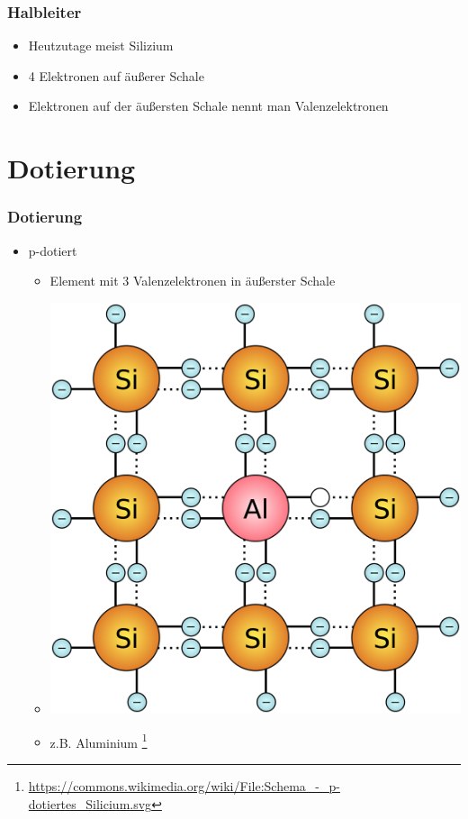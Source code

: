 \begin{frame}
    \frametitle{Halbleiter}
    \begin{center}
    \begin{itemize}
			\item Heutzutage meist Silizium
			\item 4 Elektronen auf äußerer Schale
			\item Elektronen auf der äußersten Schale nennt man Valenzelektronen
    \end{itemize}
	\end{center}
\end{frame}

\section*{Dotierung}

\begin{frame}
    \frametitle{Dotierung}
      	\begin{itemize}
			\item p-dotiert
      		\begin{itemize}
				\item Element mit 3 Valenzelektronen in äußerster Schale
				\item \includegraphics[height=.7\textheight]{e12/p-dot.png}
				\item z.B. Aluminium
        \footnote{\tiny \url{https://commons.wikimedia.org/wiki/File:Schema_-_p-dotiertes_Silicium.svg}}
    	\end{itemize}
    \end{itemize}
\end{frame}

